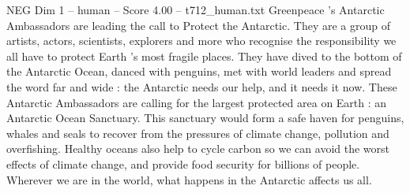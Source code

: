 \begin{textsample}{NEG Dim 1 – human – Score 4.00 – t712\_human.txt}  \label{ex:f1_neg_045}
Greenpeace ’s Antarctic Ambassadors are leading the call to Protect the Antarctic.
They are a group of artists, actors, scientists, explorers and more who recognise the responsibility we all have to protect Earth ’s most fragile places.
They have dived to the bottom of the Antarctic Ocean, danced with penguins, met with world leaders and spread the word far and wide : the Antarctic needs our help, and it needs it now.
These Antarctic Ambassadors are calling for the largest protected area on Earth : an Antarctic Ocean Sanctuary.
This sanctuary would form a safe haven for penguins, whales and seals to recover from the pressures of climate change, pollution and overfishing.
Healthy oceans also help to cycle carbon so we can avoid the worst effects of climate change, and provide food security for billions of people.
Wherever we are in the world, what happens in the Antarctic affects us all.

\end{textsample}
